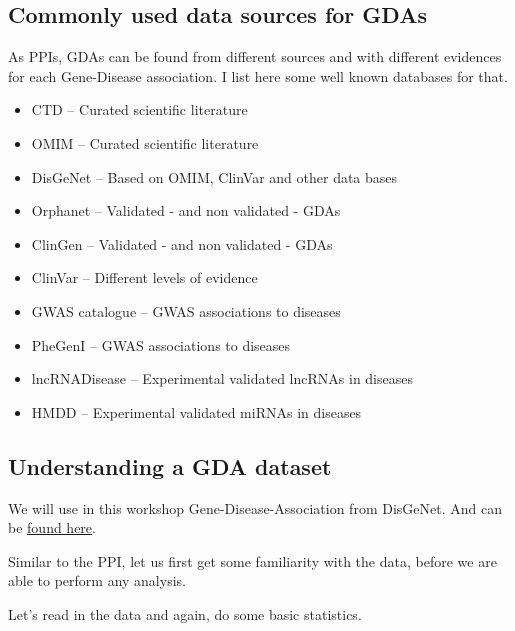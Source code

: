 \documentclass[
]{book}
\begin{document}
\hypertarget{commonly-used-data-sources-for-gdas}{%
\subsection{Commonly used data sources for GDAs}\label{commonly-used-data-sources-for-gdas}}

As PPIs, GDAs can be found from different sources and with different evidences for each Gene-Disease association. I list here some well known databases for that.

\begin{itemize}
\item
  CTD -- Curated scientific literature \citep{davis2020}
\item
  OMIM -- Curated scientific literature \citep{mckusick2007}
\item
  DisGeNet -- Based on OMIM, ClinVar and other data bases \citep{piñero2019}
\item
  Orphanet -- Validated - and non validated - GDAs
\item
  ClinGen -- Validated - and non validated - GDAs \citep{rehm2015}
\item
  ClinVar -- Different levels of evidence \citep{landrum2019}
\item
  GWAS catalogue -- GWAS associations to diseases \citep{buniello2018}
\item
  PheGenI -- GWAS associations to diseases \citep{ramos2013}
\item
  lncRNADisease -- Experimental validated lncRNAs in diseases \citep{chen2012}
\item
  HMDD -- Experimental validated miRNAs in diseases \citep{huang2018}
\end{itemize}

\hypertarget{understanding-a-gda-dataset}{%
\subsection{Understanding a GDA dataset}\label{understanding-a-gda-dataset}}

We will use in this workshop Gene-Disease-Association from DisGeNet. And can be \href{https://github.com/deisygysi/NetMed_Workshop/blob/master/data/curated_gene_disease_associations.tsv}{found here}.

Similar to the PPI, let us first get some familiarity with the data, before we are able to perform any analysis.

Let's read in the data and again, do some basic statistics.
\end{document}
